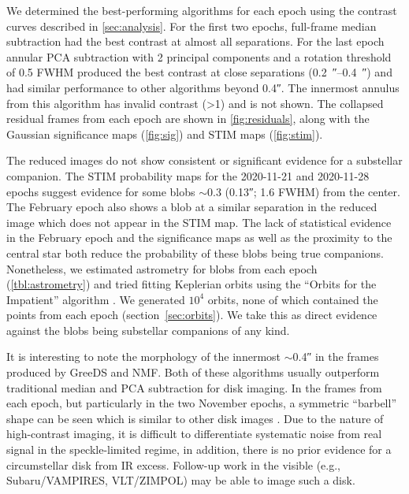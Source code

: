 \documentclass[twocolumn,linenumbers]{aastex631}
\begin{document}
We determined the best-performing algorithms for each epoch using the contrast curves described in \cref{sec:analysis}. For the first two epochs, full-frame median subtraction had the best contrast at almost all separations. For the last epoch annular PCA subtraction with 2 principal components and a rotation threshold of 0.5 FWHM produced the best contrast at close separations (\qtyrange{0.2}{0.4}{\arcsecond}) and had similar performance to other algorithms beyond \ang{;;0.4}. The innermost annulus from this algorithm has invalid contrast (\textgreater1) and is not shown. The collapsed residual frames from each epoch are shown in \cref{fig:residuals}, along with the Gaussian significance maps (\cref{fig:sig}) and STIM maps (\cref{fig:stim}).

The reduced images do not show consistent or significant evidence for a substellar companion. The STIM probability maps for the 2020-11-21 and 2020-11-28 epochs suggest evidence for some blobs $\sim$\qty{0.3}{\au} (\ang{;;0.13}; 1.6 FWHM) from the center. The February epoch also shows a blob at a similar separation in the reduced image which does not appear in the STIM map. The lack of statistical evidence in the February epoch and the significance maps as well as the proximity to the central star both reduce the probability of these blobs being true companions. Nonetheless, we estimated astrometry for blobs from each epoch (\cref{tbl:astrometry}) and tried fitting Keplerian orbits using the ``Orbits for the Impatient'' algorithm \citep[OFTI;][]{blunt_orbits_2017}. We generated $10^4$ orbits, none of which contained the points from each epoch (section~\ref{sec:orbits}). We take this as direct evidence against the blobs being substellar companions of any kind.

It is interesting to note the morphology of the innermost $\sim$\ang{;;0.4} in the frames produced by GreeDS and NMF. Both of these algorithms usually outperform traditional median and PCA subtraction for disk imaging. In the frames from each epoch, but particularly in the two November epochs, a symmetric ``barbell'' shape can be seen which is similar to other disk images \citep[e.g., fig.~7][]{norris_vampires_2014}. Due to the nature of high-contrast imaging, it is difficult to differentiate systematic noise from real signal in the speckle-limited regime, in addition, there is no prior evidence for a circumstellar disk from IR excess. Follow-up work in the visible (e.g., Subaru/VAMPIRES, VLT/ZIMPOL) may be able to image such a disk.
\end{document}
